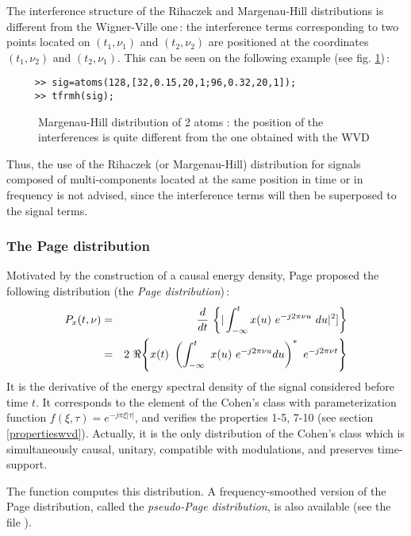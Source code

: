   The interference structure of the Rihaczek and Margenau-Hill
distributions is different from the Wigner-Ville one\,: the interference
terms corresponding to two points located on $(t_1,\nu_1)$ and
$(t_2,\nu_2)$ are positioned at the coordinates $(t_1,\nu_2)$ and
$(t_2,\nu_1)$. This can be seen on the following example (see
fig. \ref{En1fig14})\,:
\begin{verbatim}
     >> sig=atoms(128,[32,0.15,20,1;96,0.32,20,1]);
     >> tfrmh(sig);
\end{verbatim}
\begin{figure}[htb]
\epsfxsize=10cm
\epsfysize=8cm
\centerline{}
\caption{\label{En1fig14}Margenau-Hill distribution of 2 atoms : the
position of the interferences is quite different from the one obtained with
the WVD}
\end{figure}
Thus, the use of the Rihaczek (or Margenau-Hill) distribution for signals
composed of multi-components located at the same position in time or in
frequency is not advised, since the interference terms will then be
superposed to the signal terms.

\subsubsection{The Page distribution}
  Motivated by the construction of a causal energy density, Page proposed
the following distribution (the {\it Page distribution})\,:
\begin{eqnarray*}
P_x(t,\nu) &=& {d\over dt}\,
\left\{{
|\int_{-\infty}^t x(u)\ e^{-j2\pi \nu u}\
du|^2]
}\right\}\\ 
 &=& 2\ \Re{\left\{x(t)\ \left(\int_{-\infty}^t\ x(u)\ e^{-j2\pi \nu
u}du\right)^* \ e^{-j2\pi \nu t}\right\}}
\end{eqnarray*}
It is the derivative of the energy spectral density of the signal
considered before time $t$. It corresponds to the element of the Cohen's
class with parameterization function $f(\xi,\tau)=e^{-j\pi \xi |\tau|}$, and
verifies the properties 1-5, 7-10 (see section \ref{propertieswvd}).
Actually, it is the only distribution of the Cohen's class which is
simultaneously causal, unitary, compatible with modulations, and preserves
time-support.  

 The function  computes this distribution. A
frequency-smoothed version of the Page distribution, called the {\it
pseudo-Page distribution}, is also available (see the file \index{\ttfamily
tfrppage}{\ttfamily tfrppage.m}).


